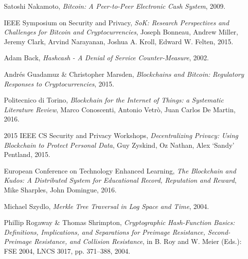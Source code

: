 %
%
%
\begin{thebibliography}{1}

  Satoshi Nakamoto,
  \emph{Bitcoin: A Peer-to-Peer Electronic Cash System},
  2009.

  IEEE Symposium on Security and Privacy,
  \emph{SoK: Research Perspectives and Challenges for Bitcoin and
Cryptocurrencies},
  Joseph Bonneau, Andrew Miller, Jeremy Clark, Arvind Narayanan, Joshua
A. Kroll, Edward W. Felten,
  2015.

  Adam Back,
  \emph{Hashcash - A Denial of Service Counter-Measure},
  2002.

  Andrés Guadamuz \& Christopher Marsden,
  \emph{Blockchains and Bitcoin: Regulatory Responses to Cryptocurrencies},
  2015.

  Politecnico di Torino,
  \emph{Blockchain for the Internet of Things: a Systematic Literature Review},
  Marco Conoscenti, Antonio Vetrò, Juan Carlos De Martin,
  2016.

  2015 IEEE CS Security and Privacy Workshops,
  \emph{Decentralizing Privacy: Using Blockchain to Protect Personal Data},
  Guy Zyskind, Oz Nathan, Alex `Sandy' Pentland,
  2015.

  European Conference on Technology Enhanced Learning,
  \emph{The Blockchain and Kudos: A Distributed System for Educational Record,
Reputation and Reward},
  Mike Sharples, John Domingue,
  2016.

  Michael Szydlo,
  \emph{Merkle Tree Traversal in Log Space and Time},
  2004.

  Phillip Rogaway \& Thomas Shrimpton,
  \emph{Cryptographic Hash-Function Basics: Definitions, Implications, and
Separations for Preimage Resistance, Second-Preimage Resistance, and Collision
Resistance},
  in B. Roy and W. Meier (Eds.): FSE 2004, LNCS 3017, pp. 371–388,
  2004.


\end{thebibliography}
